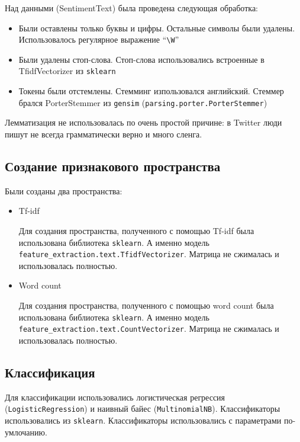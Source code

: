 \documentclass[12pt, a4paper]{article}
\begin{document}
            Над данными (SentimentText) была проведена следующая обработка:
            \begin{itemize}
                \item Были оставлены только буквы и цифры. Остальные символы были удалены. Использовалось регулярное выражение ``\verb|\W|''
                \item Были удалены стоп-слова. Стоп-слова использовались встроенные в TfidfVectorizer из \verb|sklearn|
                \item Токены были отстемлены. Стемминг изпользовался английский. Стеммер брался PorterStemmer из \verb|gensim| (\verb|parsing.porter.PorterStemmer|)
            \end{itemize}

            Лемматизация не использовалась по очень простой причине: в Twitter люди пишут не всегда грамматически верно и много сленга.

        \subsection{Создание признакового пространства}
            Были созданы два пространства:
            \begin{itemize}
                \item Tf-idf

                Для создания пространства, полученного с помощью Tf-idf была использована библиотека \verb|sklearn|. А именно модель \verb| feature_extraction.text.TfidfVectorizer|. Матрица не сжималась и использовалась полностью.

                \item Word count

                Для создания пространства, полученного с помощью word count была использована библиотека \verb|sklearn|. А именно модель \verb| feature_extraction.text.CountVectorizer|. Матрица не сжималась и использовалась полностью.

            \end{itemize}

        \subsection{Классификация}
            Для классификации использовались логистическая регрессия (\verb|LogisticRegression|) и наивный байес (\verb|MultinomialNB|). Классификаторы использовались из \verb|sklearn|. Классификаторы использовались с параметрами по-умлочанию.
\end{document}
